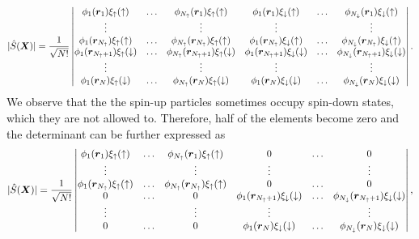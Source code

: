 \begin{equation*}
|\hat{S}(\boldsymbol{{X}})|=\frac{1}{\sqrt{N!}}
\begin{vmatrix}
\phi_1(\boldsymbol{r}_1)\xi_{\uparrow}(\uparrow) & \hdots & \phi_{N_{\uparrow}}(\boldsymbol{r}_1)\xi_{\uparrow}(\uparrow) & \phi_{1}(\boldsymbol{r}_1)\xi_{\downarrow}(\uparrow) & \hdots & \phi_{N_{\downarrow}}(\boldsymbol{r}_1)\xi_{\downarrow}(\uparrow)\\
\vdots & & \vdots & \vdots & & \vdots \\
\phi_1(\boldsymbol{r}_{N_{\uparrow}})\xi_{\uparrow}(\uparrow) & \hdots & \phi_{N_{\uparrow}}(\boldsymbol{r}_{N_{\uparrow}})\xi_{\uparrow}(\uparrow) & \phi_{1}(\boldsymbol{r}_{N_{\uparrow}})\xi_{\downarrow}(\uparrow) & \hdots & \phi_{N_{\downarrow}}(\boldsymbol{r}_{N_{\uparrow}})\xi_{\downarrow}(\uparrow)\\
\phi_1(\boldsymbol{r}_{N_{\uparrow}+1})\xi_{\uparrow}(\downarrow) & \hdots & \phi_{N_{\uparrow}}(\boldsymbol{r}_{N_{\uparrow}+1})\xi_{\uparrow}(\downarrow) & \phi_{1}(\boldsymbol{r}_{N_{\uparrow}+1})\xi_{\downarrow}(\downarrow) & \hdots & \phi_{N_{\downarrow}}(\boldsymbol{r}_{N_{\uparrow}+1})\xi_{\downarrow}(\downarrow)\\
\vdots & & \vdots & \vdots & & \vdots \\
\phi_1(\boldsymbol{r}_N)\xi_{\uparrow}(\downarrow) & \hdots & \phi_{N_{\uparrow}}(\boldsymbol{r}_N)\xi_{\uparrow}(\downarrow) & \phi_{1}(\boldsymbol{r}_N)\xi_{\downarrow}(\downarrow) & \hdots & \phi_{N_{\downarrow}}(\boldsymbol{r}_N)\xi_{\downarrow}(\downarrow)\\
\end{vmatrix}.
\end{equation*}
We observe that the the spin-up particles sometimes occupy spin-down states, which they are not allowed to. Therefore, half of the elements become zero and the determinant can be further expressed as
\begin{equation*}
|\hat{S}(\boldsymbol{{X}})|=\frac{1}{\sqrt{N!}}
\begin{vmatrix}
\phi_1(\boldsymbol{r}_1)\xi_{\uparrow}(\uparrow) & \hdots & \phi_{N_{\uparrow}}(\boldsymbol{r}_1)\xi_{\uparrow}(\uparrow) & 0 & \hdots & 0\\
\vdots & & \vdots & \vdots & & \vdots \\
\phi_1(\boldsymbol{r}_{N_{\uparrow}})\xi_{\uparrow}(\uparrow) & \hdots & \phi_{N_{\uparrow}}(\boldsymbol{r}_{N_{\uparrow}})\xi_{\uparrow}(\uparrow) & 0 & \hdots & 0\\
0 & \hdots & 0 & \phi_{1}(\boldsymbol{r}_{N_{\uparrow}+1})\xi_{\downarrow}(\downarrow) & \hdots & \phi_{N_{\downarrow}}(\boldsymbol{r}_{N_{\uparrow}+1})\xi_{\downarrow}(\downarrow)\\
\vdots & & \vdots & \vdots & & \vdots \\
0 & \hdots & 0 & \phi_{1}(\boldsymbol{r}_N)\xi_{\downarrow}(\downarrow) & \hdots & \phi_{N_{\downarrow}}(\boldsymbol{r}_N)\xi_{\downarrow}(\downarrow)\\
\end{vmatrix},
\end{equation*}
